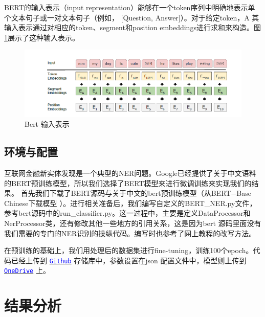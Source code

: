 \documentclass[11pt]{article}
\begin{document}
BERT的输入表示（input representation）能够在一个token序列中明确地表示单个文本句子或一对文本句子（例如， [Question, Answer]）。对于给定token，A%
其输入表示通过对相应的token、segment和position embeddings进行求和来构造。图\ref{embedding}展示了这种输入表示。

\begin{figure}[!ht]
    \centering
    \includegraphics[width=\linewidth]{pic/embedding.png}
    \caption{Bert 输入表示}
    \label{embedding}
\end{figure}

\subsection{环境与配置}
互联网金融新实体发现是一个典型的NER问题。Google已经提供了关于中文语料的BERT预训练模型，所以我们选择了BERT模型来进行微调训练来实现我们的结果。 %
首先我们下载了BERT源码与关于中文的bert预训练模型（从BERT$-$Base Chinese下载模型 ）。进行相关准备后，我们编写自定义的BERT\_NER.py文件，
参考bert源码中的run\_classifier.py。这一过程中，主要是定义DataProcessor和NerProcessor类，还有修改其他一些地方的引用关系，这是因为bert%
源码里面没有我们需要的专门的NER识别的操纵代码。编写时也参考了网上教程的改写方法。\par

在预训练的基础上，我们用处理后的数据集进行fine-tuning，训练100个epoch。代码已经上传到 \hyperref[code]{\texttt{\textcolor{blue}{Github}}} 存储库中，参数设置在json %
配置文件中，模型则上传到 \hyperref[code]{\texttt{\textcolor{blue}{OneDrive}}} 上。 

\section{结果分析}
\end{document}
